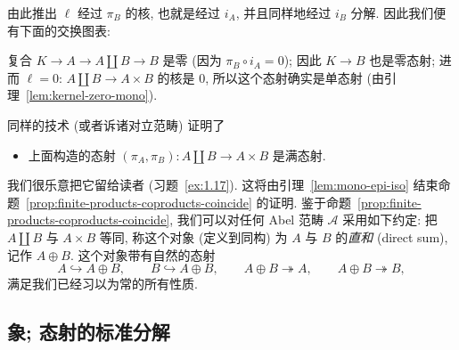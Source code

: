 \begin{itemize}
\begin{center}
\end{center}
由此推出 $\ell$ 经过 $\pi_B$ 的核, 也就是经过 $i_A$, 并且同样地经过 $i_B$ 分解. 因此我们便有下面的交换图表:
\begin{center}
\end{center}
复合 $K\to A\to A\amalg B\to B$ 是零 (因为 $\pi_B\circ i_A=0$); 因此 $K\to B$ 也是零态射; 进而 $\ell=0$: $A\amalg B\to A\times B$ 的核是 $0$, 所以这个态射确实是单态射 (由引理~\ref{lem:kernel-zero-mono}).
\end{itemize}
\indent 同样的技术 (或者诉诸对立范畴) 证明了
\begin{itemize}
\item 上面构造的态射 $(\pi_A,\pi_B):A\amalg B\to A\times B$ 是满态射.
\end{itemize}
我们很乐意把它留给读者 (习题~\ref{ex:1.17}).
这将由引理~\ref{lem:mono-epi-iso} 结束命题~\ref{prop:finite-products-coproducts-coincide} 的证明.
鉴于命题~\ref{prop:finite-products-coproducts-coincide}, 我们可以对任何 Abel 范畴 $\mathcal{A}$ 采用如下约定: 把 $A\amalg B$ 与 $A\times B$ 等同, 称这个对象 (定义到同构) 为 $A$ 与 $B$ 的\emph{直和} (direct sum), 记作 $A\oplus B$. 这个对象带有自然的态射
\[
A\hookrightarrow A\oplus B,\qquad B\hookrightarrow A\oplus B,\qquad A\oplus B\twoheadrightarrow A,\qquad A\oplus B\twoheadrightarrow B,
\]
满足我们已经习以为常的所有性质.

\subsection{象; 态射的标准分解}
\label{subsec:images-canonical-decomposition}

